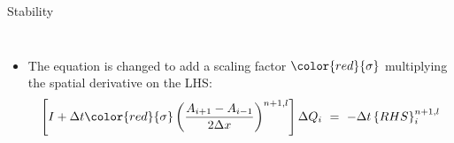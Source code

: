 \begin{frame}{Stability}
  \begin{columns}
    \begin{itemize}
      \item The equation is changed to add a scaling factor $\color{red}{\sigma}$ multiplying the 
            spatial derivative on the LHS:
      \begin{equation}
        		\left[I+\Delta{t}{\color{red}{\sigma}}
            \left(\frac{A_{i+1}-A_{i-1}}{2\Delta{x}}\right)^{n+1,l}\right]\Delta{Q}_i~=~
            -\Delta{t}\left\{RHS\right\}_i^{n+1, l}
      \end{equation}
      \begin{table}[htp!]
        \centering
        \label{tab:Scaling}
      \end{table}
    \end{itemize}   
  \end{columns}
\end{frame}


